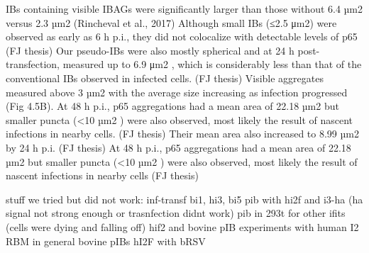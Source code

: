 IBs containing visible IBAGs were significantly larger than those without 6.4 µm2 versus 2.3 µm2 (Rincheval et al., 2017)
Although small IBs (≤2.5 μm2) were observed as early as 6 h p.i., they did not colocalize with detectable levels of p65 (FJ thesis)
Our pseudo-IBs were also mostly spherical and at 24 h post-transfection, measured up to 6.9 μm2 , which is considerably less than that of the conventional IBs observed in infected cells. (FJ thesis)
Visible aggregates measured above 3 µm2 with the average size increasing as infection progressed (Fig 4.5B). At 48 h p.i., p65 aggregations had a mean area of 22.18 µm2 but smaller puncta (<10 µm2 ) were also observed, most likely the result of nascent infections in nearby cells. (FJ thesis)
Their mean area also increased to 8.99 µm2 by 24 h p.i. (FJ thesis)
At 48 h p.i., p65 aggregations had a mean area of 22.18 µm2 but smaller puncta (<10 µm2 ) were also observed, most likely the result of nascent infections in nearby cells (FJ thesis)

stuff we tried but did not work: 
inf-transf bi1, hi3, bi5
pib with hi2f and i3-ha (ha signal not strong enough or trasnfection didnt work)
pib in 293t for other ifits (cells were dying and falling off)
hif2 and bovine pIB
experiments with human I2 RBM
in general bovine pIBs
hI2F with bRSV
